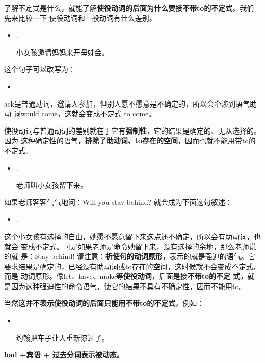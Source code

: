 了解不定式是什么，就能了解\textbf{使役动词的后面为什么要接不带to的不定式}。我们先来比较一下
使役动词和一般动词有什么差别。

\begin{itemize}
\item {}   .

  小女孩邀请妈妈来开母姊会。
\end{itemize}

这个句子可以改写为：

\begin{itemize}
\item  {}  .
\end{itemize}

ask是普通动词，邀请人参加，但别人愿不愿意是不确定的，所以会牵涉到语气助动
词would come，这就会变成不定式 to come。

使役动词与普通动词的差别就在于它有\textbf{强制性}，它的结果是确定的、无从选择的。因为
这种确定性的语气，\textbf{排除了助动词、to存在的空间}，因而也就不能用带to的不定式。

\begin{itemize}
\item  {}   .

  老师叫小女孩留下来。
\end{itemize}

如果老师客客气气地问：Will you stay behind? 就会成为下面这句叙述：
\begin{itemize}
\item {}   .
\end{itemize}
这个小女孩有选择的自由，她愿不愿意留下来这点还不确定，所以会有助动词，也就会
变成不定式。可是如果老师是命令她留下来，没有选择的余地，那么老师说的就
是：Stay behind! 请注意：\textbf{祈使句的动词原形}，表示的就是强迫的语气。它
要求结果是确定的，已经没有助动词或to存在的空间，这时候就不会变成不定式，而是
动词原形。像let、have、make等\textbf{使役动词}，后面是接\textbf{不带to的不定
  式}，就是因为这种强迫性的命令语气，使它的结果不具有不确定性，因而不能用to。

当然\textbf{这并不表示使役动词的后面只能用不带to的不定式}，例如：
\begin{itemize}
\item {}   .

  约翰把车子让人重新漆过了。
\end{itemize}
\textbf{had +宾语 + 过去分词表示被动态。}

